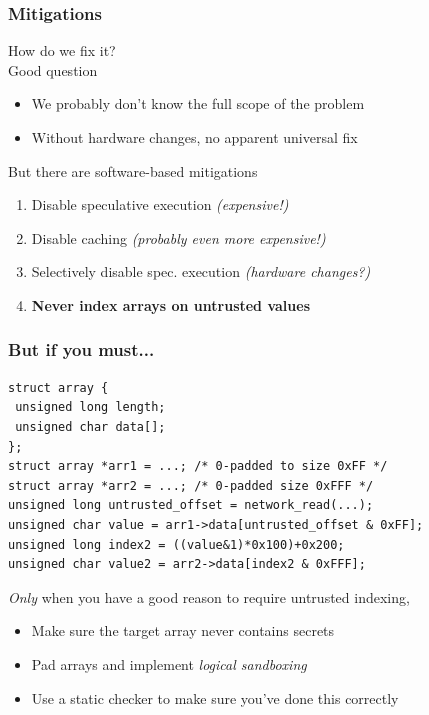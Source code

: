 \documentclass[10pt,handout]{beamer}
\begin{document}

\begin{frame}

\frametitle{Mitigations}

How do we fix it?
\\[1em]

\pause
Good question
\begin{itemize}
\item We probably don't know the full scope of the problem
\item Without hardware changes, no apparent universal fix\\[1em]
\end{itemize}

\pause
But there are software-based mitigations
\begin{enumerate}
  \pause\item Disable speculative execution \pause\emph{(expensive!)}
  \pause\item Disable caching \pause\emph{(probably even more expensive!)}
  \pause\item Selectively disable spec. execution \pause\emph{(hardware changes?)}
  \pause\item \textbf{Never index arrays on untrusted values}
\end{enumerate}

\end{frame}


\begin{frame}[fragile]

\frametitle{But if you must...}

\begin{lstlisting}[basicstyle=\small,style=customjava]
struct array {
 unsigned long length;
 unsigned char data[];
};
struct array *arr1 = ...; /* 0-padded to size 0xFF */
struct array *arr2 = ...; /* 0-padded size 0xFFF */
unsigned long untrusted_offset = network_read(...);
unsigned char value = arr1->data[untrusted_offset & 0xFF];
unsigned long index2 = ((value&1)*0x100)+0x200;
unsigned char value2 = arr2->data[index2 & 0xFFF];
\end{lstlisting}

\vspace*{1em}
\emph{Only} when you have a good reason to require untrusted indexing,
\begin{itemize}
\pause\item Make sure the target array never contains secrets
\pause\item Pad arrays and implement \emph{logical sandboxing}
\pause\item Use a static checker to make sure you've done this correctly
\end{itemize}

\end{frame}
\end{document}
